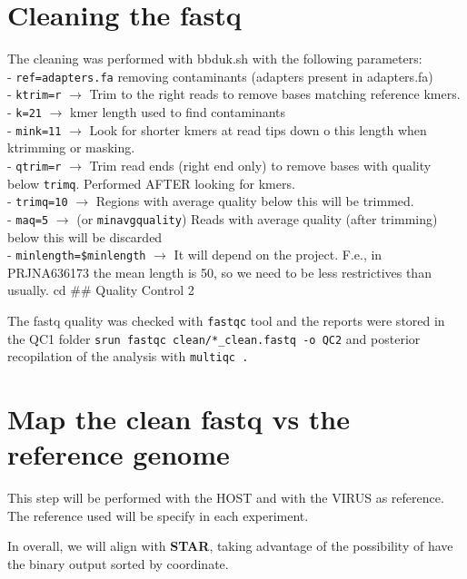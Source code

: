 \documentclass[
]{book}
\begin{document}
\hypertarget{cleaning-the-fastq}{%
\section{Cleaning the fastq}\label{cleaning-the-fastq}}

The cleaning was performed with bbduk.sh with the following parameters:\\
- \texttt{ref=adapters.fa} removing contaminants (adapters present in adapters.fa)\\
- \texttt{ktrim=r} \(\rightarrow\) Trim to the right reads to remove bases matching reference kmers.\\
- \texttt{k=21} \(\rightarrow\) kmer length used to find contaminants\\
- \texttt{mink=11} \(\rightarrow\) Look for shorter kmers at read tips down o this length when ktrimming or masking.\\
- \texttt{qtrim=r} \(\rightarrow\) Trim read ends (right end only) to remove bases with quality below \texttt{trimq}. Performed AFTER looking for kmers.\\
- \texttt{trimq=10} \(\rightarrow\) Regions with average quality below this will be trimmed.\\
- \texttt{maq=5} \(\rightarrow\) (or \texttt{minavgquality}) Reads with average quality (after trimming) below this will be discarded\\
- \texttt{minlength=\$minlength} \(\rightarrow\) It will depend on the project. F.e., in PRJNA636173 the mean length is 50, so we need to be less restrictives than usually.
cd
\#\# Quality Control 2

The fastq quality was checked with \texttt{fastqc} tool and the reports were stored in the QC1 folder
\texttt{srun\ fastqc\ clean/*\_clean.fastq\ -o\ QC2} and posterior recopilation of the analysis with \texttt{multiqc\ .}

\hypertarget{map-the-clean-fastq-vs-the-reference-genome}{%
\section{Map the clean fastq vs the reference genome}\label{map-the-clean-fastq-vs-the-reference-genome}}

This step will be performed with the HOST and with the VIRUS as reference.
The reference used will be specify in each experiment.

In overall, we will align with \textbf{STAR}, taking advantage of the possibility of have the binary output sorted by coordinate.
\end{document}
